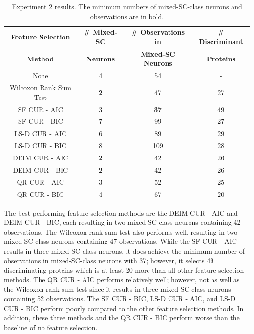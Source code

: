 \documentclass[12pt]{article}
\begin{document}
\begin{table}[h]
    \centering
   \begin{tabular}{|c|c|c|c|}
        \hline
        \textbf{Feature Selection} & \textbf{\# Mixed-SC} & \textbf{\# Observations in} & \textbf{\# Discriminant} \\
        \textbf{Method} & \textbf{Neurons} & \textbf{Mixed-SC Neurons} & \textbf{Proteins} \\
        \hline
        None & 4 & 54 & - \\
        Wilcoxon Rank Sum Test  & \textbf{2} & 47 & 27 \\
        SF CUR - AIC & 3 & \textbf{37} & 49 \\
        SF CUR - BIC  & 7 & 99 & 27 \\
        LS-D CUR - AIC  & 6 & 89 & 29 \\
        LS-D CUR - BIC  & 8  & 109 & 28 \\
        DEIM CUR - AIC  & \textbf{2}  & 42 & 26 \\
        DEIM CUR - BIC  & \textbf{2}  & 42 & 26 \\
        QR CUR - AIC &  3 & 52 & 25 \\
        QR CUR - BIC &  4 & 67 & 20 \\
        \hline
    \end{tabular}
    \caption{Experiment 2 results.  The minimum numbers of mixed-SC-class neurons and observations are in bold.}
    \label{tab:SC_res}
\end{table}

The best performing feature selection methods are the DEIM CUR - AIC and DEIM CUR - BIC, each resulting in two mixed-SC-class neurons containing 42 observations.  The Wilcoxon rank-sum test also performs well, resulting in two mixed-SC-class neurons containing 47 observations.  While the SF CUR - AIC results in three mixed-SC-class neurons, it does achieve the minimum number of observations in mixed-SC-class neurons with 37; however, it selects 49 discriminating proteins which is at least 20 more than all other feature selection methods.  The QR CUR - AIC performs relatively well; however, not as well as the Wilcoxon rank-sum test since it results in three mixed-SC-class neurons containing 52 observations. The SF CUR - BIC, LS-D CUR - AIC, and LS-D CUR - BIC perform poorly compared to the other feature selection methods.  In addition, these three methods and the QR CUR - BIC perform worse than the baseline of no feature selection. 
\end{document}
